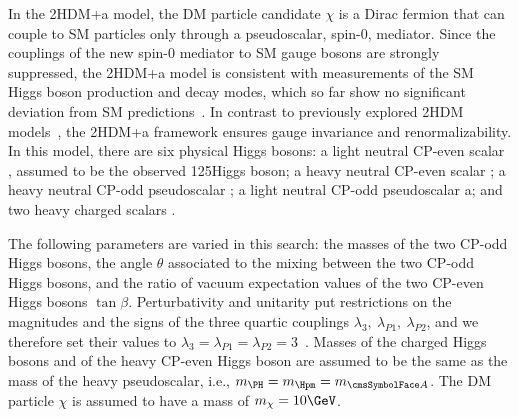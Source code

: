 In the 2HDM+a model, the DM particle candidate $\chi$ is a Dirac fermion that can couple to SM particles only through a
pseudoscalar, spin-0, mediator. Since the couplings of the new spin-0
mediator to SM gauge bosons are strongly suppressed, the 2HDM+a model
is consistent with  measurements of the SM Higgs boson production and
decay modes, which so far show no significant deviation from SM predictions~\cite{Khachatryan:2016vau}. In contrast to previously explored 2HDM models~\cite{2HDM,Aaboud:2017yqz,Sirunyan:2017hnk}, the 2HDM+a framework ensures gauge invariance and renormalizability. In this model, there are six physical Higgs bosons:
a light neutral CP-even scalar \Ph, assumed to be the
observed 125\GeV Higgs boson; a heavy neutral CP-even scalar \PH;
a heavy neutral CP-odd pseudoscalar \Az; a light neutral CP-odd pseudoscalar a; and two heavy charged scalars \Hpm. 


The following parameters are varied in this search: the masses of the
two CP-odd Higgs bosons, the angle $\theta$ associated to the mixing
between the two CP-odd Higgs bosons, and the ratio of vacuum
expectation values of the two CP-even Higgs bosons $\tan\beta$.
Perturbativity and unitarity put restrictions on the magnitudes and the
signs of the three quartic couplings
$\lambda_3,~\lambda_{P1},~\lambda_{P2}$,
and we therefore set their values to $\lambda_3=\lambda_{P1}=\lambda_{P2}=3$~\cite{Bauer2017}. Masses of the charged Higgs bosons and of the heavy CP-even Higgs boson are assumed to be the same as the mass of the heavy pseudoscalar, i.e., $m_{\PH}=m_{\Hpm}=m_{\Az}$. The DM particle $\chi$ is assumed to have a mass of $m_\chi=10\GeV$.


